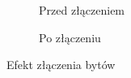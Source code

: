 \documentclass[12pt,a4paper]{article} %
\begin{document}
    \begin{figure}[h!]
    \centering
    \begin{subfigure}{.45\textwidth}
      \centering
      \caption{Przed złączeniem}
    \end{subfigure}
    \begin{subfigure}{.45\textwidth}
      \centering
      \caption{Po złączeniu}
    \end{subfigure}
    \caption{Efekt złączenia bytów}
    \label{fig:merge}
    \end{figure}
\end{document}
